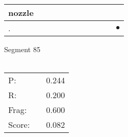 \documentclass[landscape]{article}
\newcommand{\ssp}{\hspace{2pt}}
\newcommand{\mex}{\cellcolor{g}$\bullet$}
\begin{document}
\begin{tabular}{|l|p{10pt}|p{10pt}|p{10pt}|p{10pt}|p{10pt}|p{10pt}|p{10pt}|p{10pt}|p{10pt}|p{10pt}|}
\hline
\ssp nozzle \ssp&\hspace{2pt}&\hspace{2pt}&\hspace{2pt}&\hspace{2pt}&\hspace{2pt}&\hspace{2pt}&\hspace{2pt}&\hspace{2pt}&\hspace{2pt}&\hspace{2pt}\\
\hline
\ssp \cellcolor{ref9}. \ssp&\hspace{2pt}&\hspace{2pt}&\hspace{2pt}&\hspace{2pt}&\hspace{2pt}&\hspace{2pt}&\hspace{2pt}&\hspace{2pt}&\hspace{2pt}&\hspace{2pt}\mex\\
\hline
\end{tabular}

\vspace{6pt}
\noindent Segment 85\\\\
\noindent\begin{tabular}{lm{12pt}r}
\hline
P:&&0.244\\
R:&&0.200\\
Frag:&&0.600\\
Score:&&0.082\\
\end{tabular}

\newpage
\end{document}
